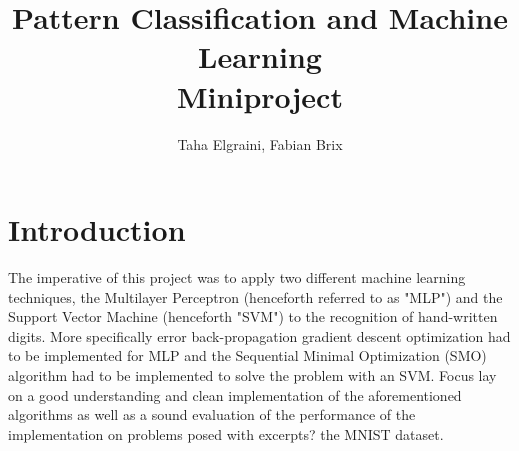 \documentclass[10pt,a4paper]{article}
\title{Pattern Classification and Machine Learning\\\Huge Miniproject}
\author{Taha Elgraini, Fabian Brix}
\begin{document}
\maketitle

\section{Introduction}
The imperative of this project was to apply two different machine learning techniques, the Multilayer Perceptron (henceforth referred to as "MLP") and the Support Vector Machine (henceforth "SVM") to the recognition of hand-written digits. More specifically error back-propagation gradient descent optimization had to be implemented for MLP and the Sequential Minimal Optimization (SMO) algorithm had to be implemented to solve the problem with an SVM. Focus lay on a good understanding and clean implementation of the aforementioned algorithms as well as a sound evaluation of the performance of the implementation on problems posed with excerpts? the MNIST dataset.


\end{document}

